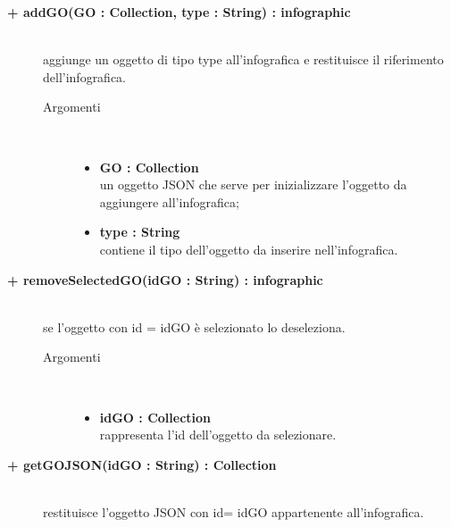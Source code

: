 \begin{description}
\begin{description}
\end{description}

\begin{description}
		\item[\textbf{\color{blue}+ addGO(GO : Collection, type : String) : infographic			}] \hfill \\
			aggiunge un oggetto di tipo type all'infografica e restituisce il riferimento dell'infografica.  

\begin{description}
			\item[Argomenti] \hfill \\
				\begin{itemize}
						\item \textbf{GO : Collection			} \hfill \\
					un oggetto JSON che serve per inizializzare l'oggetto da aggiungere all'infografica;
					  	\item \textbf{type : String			} \hfill \\
					  	contiene il tipo dell'oggetto da inserire nell'infografica.
				\end{itemize}

\end{description}

\end{description}

\begin{description}
		\item[\textbf{\color{blue}+ removeSelectedGO(idGO : String) : infographic			}] \hfill \\
			se l'oggetto con id = idGO è selezionato lo deseleziona.

\begin{description}
			\item[Argomenti] \hfill \\
				\begin{itemize}
						\item \textbf{idGO : Collection			} \hfill \\
					rappresenta l'id dell'oggetto da selezionare.
				\end{itemize}

\end{description}

\end{description}

\begin{description}
		\item[\textbf{\color{blue}+ getGOJSON(idGO : String) : Collection			}] \hfill \\
			restituisce l'oggetto JSON con id= idGO appartenente all'infografica.   


\end{description}
\end{description}
